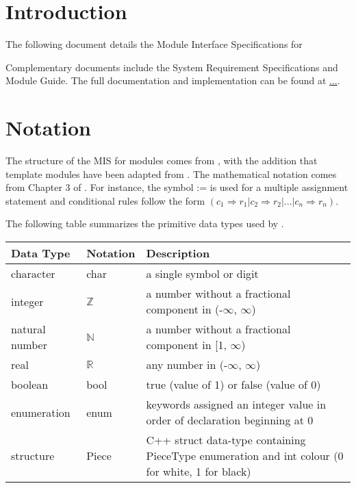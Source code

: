 \documentclass[12pt, titlepage]{article}
\begin{document}
\newpage

\tableofcontents

\newpage


\section{Introduction}

The following document details the Module Interface Specifications for

Complementary documents include the System Requirement Specifications
and Module Guide.  The full documentation and implementation can be
found at \url{...}.  

\section{Notation}


The structure of the MIS for modules comes from \citet{HoffmanAndStrooper1995},
with the addition that template modules have been adapted from
\cite{GhezziEtAl2003}.  The mathematical notation comes from Chapter 3 of
\citet{HoffmanAndStrooper1995}.  For instance, the symbol := is used for a
multiple assignment statement and conditional rules follow the form $(c_1
\Rightarrow r_1 | c_2 \Rightarrow r_2 | ... | c_n \Rightarrow r_n )$.

The following table summarizes the primitive data types used by \progname. 

\begin{center}
\renewcommand{\arraystretch}{1.2}
\noindent 
\begin{tabular}{l l p{7.5cm}} 
\toprule 
\textbf{Data Type} & \textbf{Notation} & \textbf{Description}\\ 
\midrule
character & char & a single symbol or digit\\
integer & $\mathbb{Z}$ & a number without a fractional component in (-$\infty$, $\infty$) \\
natural number & $\mathbb{N}$ & a number without a fractional component in [1, $\infty$) \\
real & $\mathbb{R}$ & any number in (-$\infty$, $\infty$)\\
boolean & bool & true (value of 1) or false (value of 0)\\
enumeration & enum & keywords assigned an integer value in order of declaration beginning at 0\\
structure & Piece & C++ struct data-type containing PieceType enumeration and int colour (0 for white, 1 for black)\\
\bottomrule
\end{tabular} 
\end{center}
\end{document}

